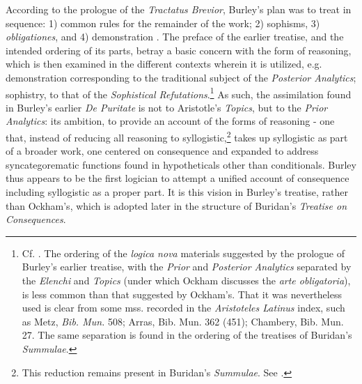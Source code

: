 	According to the prologue of the \textit{Tractatus Brevior}, Burley's plan was to treat in sequence: 1) common rules for the remainder of the work; 2) sophisms, 3) \textit{obligationes}, and 4) demonstration \autocite[p. 199]{BurleyDPAL}. The preface of the earlier treatise, and the intended ordering of its parts, betray a basic concern with the form of reasoning, which is then examined in the different contexts wherein it is utilized, e.g.  demonstration corresponding to the traditional subject of the \textit{Posterior Analytics}; sophistry, to that of the \textit{Sophistical Refutations}.\footnote{Cf. \cite[prol.]{AquinasPA}. The ordering of the \textit{logica nova} materials suggested by the prologue of Burley's earlier treatise, with the \textit{Prior} and \textit{Posterior Analytics} separated by the \textit{Elenchi} and \textit{Topics} (under which Ockham discusses the \textit{arte obligatoria}), is less common than that suggested by Ockham's. That it was nevertheless used is clear from some mss. recorded in the \textit{Aristoteles Latinus} index, such as Metz, \textit{Bib. Mun.} 508; Arras, Bib. Mun. 362 (451); Chambery, Bib. Mun. 27. The same separation is found in the ordering of the treatises of Buridan's \textit{Summulae}.} As such, the assimilation found in Burley's earlier \textit{De Puritate} is not to Aristotle's \textit{Topics}, but to the \textit{Prior Analytics}: its ambition, to provide an account of the forms of reasoning - one that, instead of reducing all reasoning to syllogistic,\footnote{This reduction remains present in Buridan's \textit{Summulae}. See \cite[6.1.5, pp. 398-400]{BuridanKlimaSD}.} takes up syllogistic as part of a broader work, one centered on consequence and expanded to address syncategorematic functions found in hypotheticals other than conditionals. Burley thus appears to be the first logician to attempt a unified account of consequence including syllogistic as a proper part. It is this vision in Burley's treatise, rather than Ockham's, which is adopted later in the structure of Buridan's \textit{Treatise on Consequences}.
	
